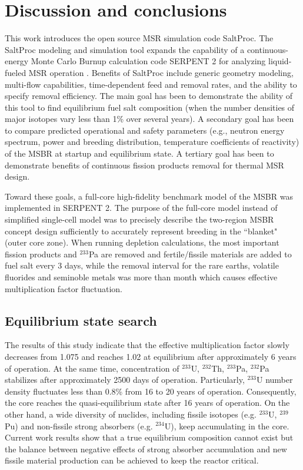 \section{Discussion and conclusions}

This work introduces the open source \gls{MSR} simulation code SaltProc. The SaltProc modeling and simulation tool expands the capability of a continuous-energy Monte Carlo Burnup calculation code SERPENT 2 for analyzing liquid-fueled \gls{MSR} operation \cite{andrei_rykhlevskii_arfc/saltproc:_2018}. Benefits of SaltProc include generic geometry modeling, multi-flow capabilities, time-dependent feed and removal rates, and the ability to specify removal efficiency. The main goal has been to demonstrate the ability of this tool to find equilibrium fuel salt composition (when the number densities of major isotopes vary less than 1\% over several years). A secondary goal has been to compare predicted operational and safety parameters (e.g., neutron energy spectrum, power and breeding distribution, temperature coefficients of reactivity) of the \gls{MSBR} at startup and equilibrium state. A tertiary goal has been to demonstrate benefits of continuous fission products removal for thermal \gls{MSR} design.

Toward these goals, a full-core high-fidelity benchmark model of the \gls{MSBR} was implemented in SERPENT 2. The purpose of the full-core model instead of simplified single-cell model \cite{betzler_molten_2017, rykhlevskii_online_2017, betzler_fuel_2018} was to precisely describe the two-region \gls{MSBR} concept design sufficiently to accurately represent breeding in the ``blanket" (outer core zone). When running depletion calculations, the most important fission products and $^{233}$Pa are removed and fertile/fissile materials are added to fuel salt every 3 days, while the removal interval for the rare earths, volatile fluorides and seminoble metals was more than month which causes effective multiplication factor fluctuation. 

\subsection{Equilibrium state search}
The results of this study indicate that the effective multiplication factor slowly decreases from 1.075 and reaches 1.02 at equilibrium after approximately 6 years of operation. At the same time, concentration of $^{233}$U, $^{232}$Th, $^{233}$Pa, $^{232}$Pa stabilizes after approximately 2500 days of operation. Particularly, $^{233}$U number density fluctuates less than 0.8\% from 16 to 20 years of operation. Consequently, the core reaches the quasi-equilibrium state after 16 years of operation. On the other hand, a wide diversity of nuclides, including fissile isotopes (e.g. $^{233}$U, $^{239}$Pu) and non-fissile strong absorbers (e.g. $^{234}$U), keep accumulating in the core. Current work results show that a true equilibrium composition cannot exist but the balance between negative effects of strong absorber accumulation and new fissile material production can be achieved to keep the reactor critical.


